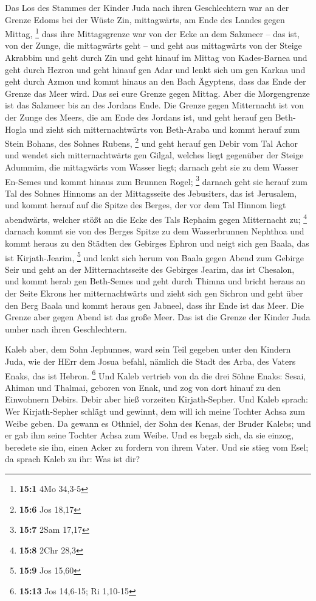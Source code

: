  Das Los des Stammes der Kinder Juda nach ihren
Geschlechtern war an der Grenze Edoms bei der Wüste Zin, mittagwärts, am
Ende des Landes gegen Mittag, \footnote{\textbf{15:1} 4Mo 34,3-5}
 dass ihre Mittagsgrenze war von der Ecke an dem Salzmeer --
das ist, von der Zunge, die mittagwärts geht --  und geht
aus mittagwärts von der Steige Akrabbim und geht durch Zin und geht
hinauf im Mittag von Kades-Barnea und geht durch Hezron und geht hinauf
gen Adar und lenkt sich um gen Karkaa  und geht durch Azmon
und kommt hinaus an den Bach Ägyptens, dass das Ende der Grenze das Meer
wird. Das sei eure Grenze gegen Mittag.  Aber die
Morgengrenze ist das Salzmeer bis an des Jordans Ende. Die Grenze gegen
Mitternacht ist von der Zunge des Meers, die am Ende des Jordans ist,
 und geht herauf gen Beth-Hogla und zieht sich
mitternachtwärts von Beth-Araba und kommt herauf zum Stein Bohans, des
Sohnes Rubens, \footnote{\textbf{15:6} Jos 18,17}  und geht
herauf gen Debir vom Tal Achor und wendet sich mitternachtwärts gen
Gilgal, welches liegt gegenüber der Steige Adummim, die mittagwärts vom
Wasser liegt; darnach geht sie zu dem Wasser En-Semes und kommt hinaus
zum Brunnen Rogel; \footnote{\textbf{15:7} 2Sam 17,17} 
darnach geht sie herauf zum Tal des Sohnes Hinnoms an der Mittagsseite
des Jebusiters, das ist Jerusalem, und kommt herauf auf die Spitze des
Berges, der vor dem Tal Hinnom liegt abendwärts, welcher stößt an die
Ecke des Tals Rephaim gegen Mitternacht zu; \footnote{\textbf{15:8} 2Chr
  28,3}  darnach kommt sie von des Berges Spitze zu dem
Wasserbrunnen Nephthoa und kommt heraus zu den Städten des Gebirges
Ephron und neigt sich gen Baala, das ist Kirjath-Jearim, \footnote{\textbf{15:9}
  Jos 15,60}  und lenkt sich herum von Baala gegen Abend
zum Gebirge Seir und geht an der Mitternachtsseite des Gebirges Jearim,
das ist Chesalon, und kommt herab gen Beth-Semes und geht durch Thimna
 und bricht heraus an der Seite Ekrons her mitternachtwärts
und zieht sich gen Sichron und geht über den Berg Baala und kommt heraus
gen Jabneel, dass ihr Ende ist das Meer.  Die Grenze aber
gegen Abend ist das große Meer. Das ist die Grenze der Kinder Juda umher
nach ihren Geschlechtern.

 Kaleb aber, dem Sohn Jephunnes, ward sein Teil gegeben
unter den Kindern Juda, wie der HErr dem Josua befahl, nämlich die Stadt
des Arba, des Vaters Enaks, das ist Hebron. \footnote{\textbf{15:13} Jos
  14,6-15; Ri 1,10-15}  Und Kaleb vertrieb von da die drei
Söhne Enaks: Sesai, Ahiman und Thalmai, geboren von Enak, 
und zog von dort hinauf zu den Einwohnern Debirs. Debir aber hieß
vorzeiten Kirjath-Sepher.  Und Kaleb sprach: Wer
Kirjath-Sepher schlägt und gewinnt, dem will ich meine Tochter Achsa zum
Weibe geben.  Da gewann es Othniel, der Sohn des Kenas, der
Bruder Kalebs; und er gab ihm seine Tochter Achsa zum Weibe.
 Und es begab sich, da sie einzog, beredete sie ihn, einen
Acker zu fordern von ihrem Vater. Und sie stieg vom Esel; da sprach
Kaleb zu ihr: Was ist dir?

